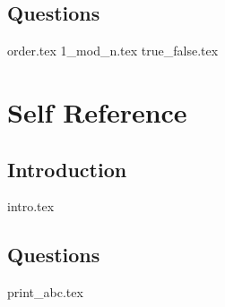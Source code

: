 \documentclass{exam}
\begin{document}
\subsection{Questions}
\begin{questions}
{order.tex}
{1_mod_n.tex}
{true_false.tex}
\end{questions}

\section{Self Reference}
\subsection{Introduction}
{intro.tex}
\subsection{Questions}
\begin{questions}
{print_abc.tex}
\end{questions}



\end{document}
